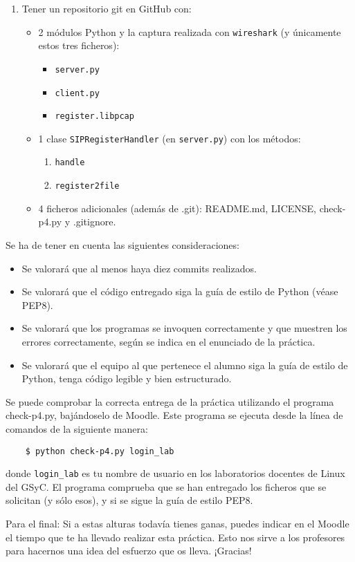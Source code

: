 \documentclass[11pt,a4paper]{article}
\begin{document}
\begin{enumerate}
  \item Tener un repositorio git en GitHub con:
  \begin{itemize}
    \item 2 módulos Python y la captura realizada con \texttt{wireshark} (y únicamente estos tres ficheros):
    \begin{itemize}
      \item \texttt{server.py}
      \item \texttt{client.py}
      \item \texttt{register.libpcap}
    \end{itemize}
    \item 1 clase \texttt{SIPRegisterHandler} (en \texttt{server.py}) con los métodos:
    \begin{enumerate}
      \item \texttt{handle}
      \item \texttt{register2file}
    \end{enumerate}
    \item 4 ficheros adicionales (además de .git): README.md, LICENSE, check-p4.py y .gitignore.
  \end{itemize}
\end{enumerate}

Se ha de tener en cuenta las siguientes consideraciones:
\begin{itemize}
  \item Se valorará que al menos haya diez commits realizados.
  \item Se valorará que el código entregado siga la guía de estilo de Python (véase PEP8).
  \item Se valorará que los programas se invoquen correctamente y que muestren los errores correctamente, según se indica en el enunciado de la práctica.
  \item Se valorará que el equipo al que pertenece el alumno siga la guía de estilo
de Python, tenga código legible y bien estructurado.
\end{itemize}

Se puede comprobar la correcta entrega de la práctica utilizando el programa check-p4.py, bajándoselo de Moodle. Este programa se ejecuta desde la línea de comandos de la siguiente manera:
\begin{verbatim}
	$ python check-p4.py login_lab
\end{verbatim}


donde \texttt{login\_lab} es tu nombre de usuario en los laboratorios docentes de Linux del GSyC. El programa comprueba que se han entregado los ficheros que se solicitan (y sólo esos), y si se sigue la guía de estilo PEP8.

\vspace{1cm}

\footnotesize{Para el final: Si a estas alturas todavía tienes ganas, puedes indicar en el Moodle el tiempo que te ha llevado realizar esta práctica. Esto nos sirve a los profesores para hacernos una idea del esfuerzo que os lleva. ¡Gracias!}
\end{document}
